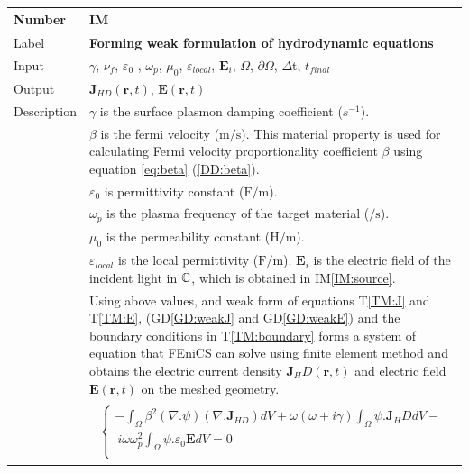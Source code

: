 \documentclass[12pt]{article}
\newcommand{\colBwidth}{0.82\textwidth} \newcommand{\colCwidth}{0.1\textwidth}
\newcounter{instnum} %
\begin{document}
	~\newline \noindent \begin{minipage}{\textwidth}
		\renewcommand*{\arraystretch}{1.5} \begin{tabular}{| p{\colAwidth} |
				p{\colBwidth}|} \hline \rowcolor[gray]{0.9} Number&
			IM{instnum}\theinstnum \label{IM:solve}\\ \hline Label& \bf
			Forming weak formulation of hydrodynamic equations\\ \hline Input& $\gamma$,
			$\nu_f$, $\varepsilon_0$ , $\omega_p$, $\mu_{0}$, $\varepsilon_{local}$,
			$\textbf{E}_i$, $\Omega$, $\partial \Omega$, $\Delta$t, $t_{final}$ \\ \hline
			Output&  $\textbf{J}_{HD}(\textbf{r},t)$, $\textbf{E}(\textbf{r},t)$ \\ \hline
			Description & $\gamma$ is the surface plasmon damping coefficient ($s^{-1}$).\\
			& $\beta$ is the fermi velocity ($\si{\meter \per \second}$). This material
			property is used for calculating Fermi velocity proportionality coefficient
			$\beta$ using equation \ref{eq:beta}  (\ref{DD:beta}).\\ & $\varepsilon_{0}$ is
			permittivity constant ($\si{\farad \per \meter}$). \\ & $\omega_p$ is the plasma
			frequency of the target material ($\si{\per \second}$).\\ & $\mu_{0}$ is the
			permeability constant ($\si{\henry \per \meter}$). \\ & $\varepsilon_{local}$ is
			the local permittivity ($\si{\farad \per \meter}$).
			$\textbf{E}_i$ is the electric field of the incident light in $\Bbb C$, which is obtained in IM\ref{IM:source}.
			\\ & Using above values, and
			weak form of equations T\ref{TM:J} and T\ref{TM:E}, (GD\ref{GD:weakJ} and
			GD\ref{GD:weakE}) and the boundary conditions in T\ref{TM:boundary} forms a
			system of equation that FEniCS can solve using finite element method and obtains
			the electric current density $\textbf{J}_HD(\textbf{r},t)$ and electric field
			$\textbf{E}(\textbf{r},t)$ on the meshed geometry.\\
			
			&	\begin{equation} \label{eq:FEniCS} \begin{gathered} \begin{cases}
						
						-\int_\Omega
						\beta^2(\nabla.\psi)(\nabla.\textbf{J}_{HD})dV+\omega(\omega+i\gamma)\int_{\Omega} \psi. \textbf{J}_HD dV - \\ \ i\omega \omega^2_p \int_\Omega \psi.\varepsilon_{0}\textbf{E}dV = 0 \\
						

\end{cases}
\end{gathered}
\end{equation}
\end{tabular}
\end{minipage}
\end{document}

